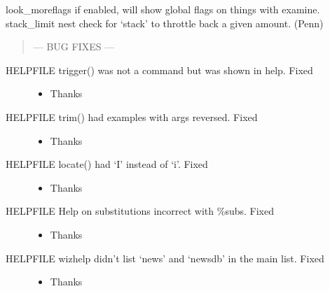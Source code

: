 \documentclass[letterpaper,10pt,english]{sphinxmanual}
\begin{document}
\sphinxAtStartPar
look\_moreflags \sphinxhyphen{} if enabled, will show global flags on things with examine.
stack\_limit \sphinxhyphen{} nest check for ‘stack’ to throttle back a given amount. (Penn)
\begin{quote}

\sphinxAtStartPar
— BUG FIXES —
\end{quote}
\begin{description}
\item[{HELPFILE \sphinxhyphen{} trigger() was not a command but was shown in help. \sphinxhyphen{}Fixed}] \leavevmode\begin{itemize}
\item {} 
\sphinxAtStartPar
Thanks 

\end{itemize}

\item[{HELPFILE \sphinxhyphen{} trim() had examples with args reversed.  \sphinxhyphen{} Fixed}] \leavevmode\begin{itemize}
\item {} 
\sphinxAtStartPar
Thanks 

\end{itemize}

\item[{HELPFILE \sphinxhyphen{} locate() had ‘I’ instead of ‘i’.  \sphinxhyphen{} Fixed}] \leavevmode\begin{itemize}
\item {} 
\sphinxAtStartPar
Thanks 

\end{itemize}

\item[{HELPFILE \sphinxhyphen{} Help on substitutions incorrect with \%\sphinxhyphen{}subs.  \sphinxhyphen{} Fixed}] \leavevmode\begin{itemize}
\item {} 
\sphinxAtStartPar
Thanks 

\end{itemize}

\item[{HELPFILE \sphinxhyphen{} wizhelp didn’t list ‘news’ and ‘newsdb’ in the main list. \sphinxhyphen{} Fixed}] \leavevmode\begin{itemize}
\item {} 
\sphinxAtStartPar
Thanks 


\end{itemize}
\end{description}
\end{document}
